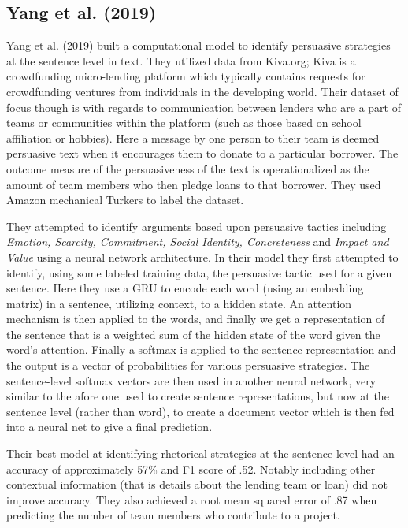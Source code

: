 \documentclass[11pt,a4paper]{article}
\begin{document}


\subsection{Yang et al. (2019) }
Yang et al. (2019) built a computational model to identify persuasive strategies at the sentence level in text. They utilized data from Kiva.org; Kiva is a crowdfunding micro-lending platform which  typically contains requests for crowdfunding ventures from individuals in the developing world. Their dataset of focus though is with regards to communication between lenders who are a part of teams or communities within the platform (such as those based on school affiliation or hobbies). Here a message by one person to their team is deemed persuasive text when it encourages them to donate to a particular borrower.  The outcome measure of the persuasiveness of the text is operationalized as the amount of team members who then pledge loans to that borrower. They used Amazon mechanical Turkers to label the dataset.

They attempted to identify arguments based upon persuasive tactics including \textit{Emotion, Scarcity, Commitment, Social Identity, Concreteness} and \textit{Impact and Value} using a neural network architecture. In their model they first attempted to  identify, using some labeled training data, the persuasive tactic used for a given sentence. Here they use a GRU to encode each word (using an embedding matrix) in a sentence, utilizing context, to a hidden state. An attention mechanism is then applied to the words, and finally we get a representation of the sentence that is a weighted sum of the hidden state of the word given the word's attention. Finally a softmax is applied to the sentence representation and the output is a vector of probabilities for various persuasive strategies. The sentence-level softmax vectors are then used in another neural network, very similar to the afore one used to create sentence representations, but now at the sentence level (rather than word), to create a document vector which is then fed into a neural net to give a final prediction.


Their best model at identifying rhetorical strategies at the sentence level had an accuracy of approximately 57\% and F1 score of .52. Notably including other contextual information (that is details about the lending team or loan) did not improve accuracy. They also achieved a root mean squared error of .87 when predicting the number of team members who contribute to a project. 
\end{document}
